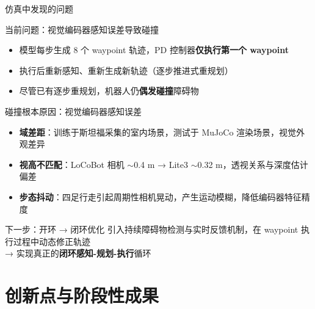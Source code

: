 \documentclass[aspectratio=169,10pt]{beamer}
\begin{document}
\begin{frame}{仿真中发现的问题}
\begin{alertblock}{当前问题：视觉编码器感知误差导致碰撞}
\begin{itemize}
\item 模型每步生成 8 个 waypoint 轨迹，PD 控制器\textbf{仅执行第一个 waypoint}
\item 执行后重新感知、重新生成新轨迹（逐步推进式重规划）
\item 尽管已有逐步重规划，机器人仍\textbf{偶发碰撞}障碍物
\end{itemize}
\end{alertblock}
\pause
\begin{exampleblock}{碰撞根本原因：视觉编码器感知误差}
\begin{itemize}
\item \textbf{域差距}：训练于斯坦福采集的室内场景，测试于 MuJoCo 渲染场景，视觉外观差异
\item \textbf{视高不匹配}：LoCoBot 相机 $\sim$0.4 m → Lite3 $\sim$0.32 m，透视关系与深度估计偏差
\item \textbf{步态抖动}：四足行走引起周期性相机晃动，产生运动模糊，降低编码器特征精度
\end{itemize}
\end{exampleblock}
\pause
\begin{block}{下一步：开环 → 闭环优化}
引入持续障碍物检测与实时反馈机制，在 waypoint 执行过程中动态修正轨迹\\
→ 实现真正的\textbf{闭环感知-规划-执行}循环
\end{block}
\end{frame}

\section{创新点与阶段性成果}
\end{document}
